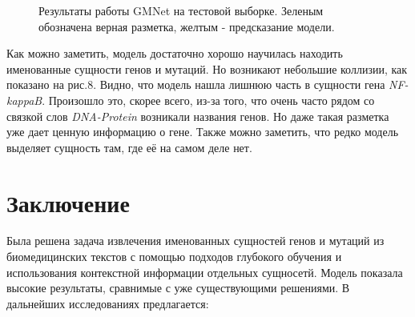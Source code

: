 \documentclass[12pt, a4paper]{article} %
\begin{document}
\begin{figure}[h]
	\label{ris:image8}
\end{figure}
\begin{figure}[h]
	\caption{Результаты работы GMNet на тестовой выборке. Зеленым обозначена верная разметка, желтым - предсказание модели.}
	\label{ris:image9}
\end{figure}


Как можно заметить, модель достаточно хорошо научилась находить именованные сущности генов и мутаций. Но возникают небольшие коллизии, как показано на рис.8. Видно, что модель нашла лишнюю часть в сущности гена \textit{NF-kappaB}. Произошло это, скорее всего, из-за того, что очень часто рядом со связкой слов \textit{DNA-Protein} возникали названия генов. Но даже такая разметка уже дает ценную информацию о гене.
Также можно заметить, что редко модель выделяет сущность там, где её на самом деле нет.


\newpage
\section{Заключение}

Была решена задача извлечения именованных сущностей генов и мутаций из биомедицинских текстов с помощью подходов глубокого обучения и использования контекстной информации отдельных сущносетй. Модель показала высокие результаты, сравнимые с уже существующими решениями. В дальнейших исследованиях предлагается:
\end{document}
